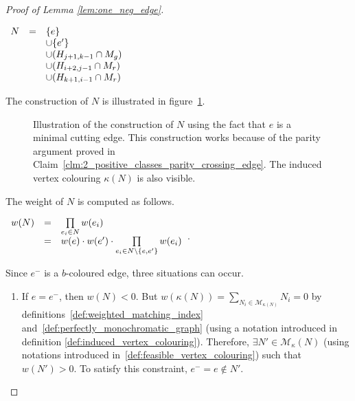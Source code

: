 \begin{proof}[Proof of Lemma \ref{lem:one_neg_edge}]
\begin{enumerate}
        \begin{center}
            $\begin{array}{r c l}
                N & = & \{e\}                             \\
                  &   & \cup \{e'\}                       \\
                  &   & \cup (H_{j+1, k-1} \cap M_g)      \\
                  &   & \cup (H_{i + 2, j - 1} \cap M_r)  \\
                  &   & \cup (H_{k+1, i-1} \cap M_r)
            \end{array}$
        \end{center}

        The construction of $N$ is illustrated in figure~\ref{fig:one-neg-edge}.

        \begin{figure}[H]
            \caption{Illustration of the construction of $N$ using the fact that $e$ is a minimal cutting edge.
                This construction works because of the parity argument proved in Claim~\ref{clm:2_positive_classes_parity_crossing_edge}.
                The induced vertex colouring $\kappa(N)$ is also visible.}
            \label{fig:one-neg-edge}
        \end{figure}

        The weight of $N$ is computed as follows.
        \begin{center}
            $\begin{array}{r c l}
            w(N) & = & \prod\limits_{e_i \in N} w(e_i) \\
                 & = & w(e) \cdot w(e') \cdot \prod\limits_{e_i \in N \setminus \{e, e'\}} w(e_i) \\
            \end{array}$.
        \end{center}

        Since $e^-$ is a $b$-coloured edge, three situations can occur.
        \begin{enumerate}
            \item If $e = e^-$, then $w(N) < 0$.
                But $w(\kappa(N)) = \sum\limits_{N_i \in \mathcal{M}_{\kappa(N)}} N_i = 0$ by definitions~\ref{def:weighted_matching_index} and~\ref{def:perfectly_monochromatic_graph} (using a notation introduced in definition \ref{def:induced_vertex_colouring}).
                Therefore, $\exists N' \in \mathcal{M}_\kappa(N)$ (using notations introduced in~\ref{def:feasible_vertex_colouring}) such that $w(N') > 0$.
                To satisfy this constraint, $e^- = e \notin N'$.\\


\end{enumerate}
\end{enumerate}
\end{proof}
